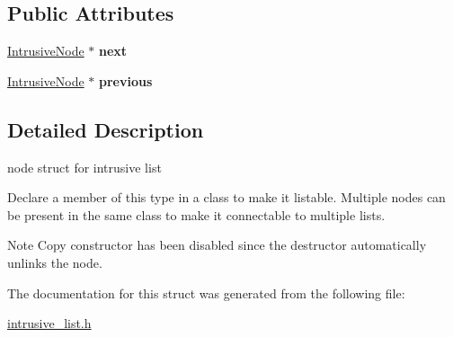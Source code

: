 \subsection*{Public Attributes}
\begin{DoxyCompactItemize}
\item 
\hypertarget{structIntrusiveNode_a172125e7f9cd0a790cb06236f38eb446}{}\hyperlink{structIntrusiveNode}{Intrusive\+Node} $\ast$ {\bfseries next}\label{structIntrusiveNode_a172125e7f9cd0a790cb06236f38eb446}

\item 
\hypertarget{structIntrusiveNode_a22e2970070331493085f8b562cf80b88}{}\hyperlink{structIntrusiveNode}{Intrusive\+Node} $\ast$ {\bfseries previous}\label{structIntrusiveNode_a22e2970070331493085f8b562cf80b88}

\end{DoxyCompactItemize}


\subsection{Detailed Description}
node struct for intrusive list 

Declare a member of this type in a class to make it listable. Multiple nodes can be present in the same class to make it connectable to multiple lists.

\begin{DoxyNote}{Note}
Copy constructor has been disabled since the destructor automatically unlinks the node. 
\end{DoxyNote}


The documentation for this struct was generated from the following file\+:\begin{DoxyCompactItemize}
\item 
\hyperlink{intrusive__list_8h}{intrusive\+\_\+list.\+h}\end{DoxyCompactItemize}
